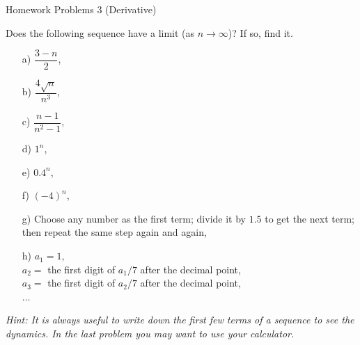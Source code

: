  \begin{center}\begin{large} Homework Problems 3 (Derivative) \end{large}\end{center}
 \bigskip




\begin{problem}
   Does the following sequence have a limit (as $n\to\infty$)? If so, find it.

    \begin{enumerate}
        \item[a) ] $\dfrac{3-n}{2}$,
        
        \item[b) ] $\dfrac{4\sqrt{n}}{n^3}$,
        
        \item[c) ] $\dfrac{n-1}{n^2-1}$,
        
        \item[d) ] $1^n$,

        \item[e) ] $0.4^n$,

        \item[f) ] $(-4)^n$,

        \item[g) ] Choose any number as the first term; divide it by $1.5$ to get the next term; then repeat the same step again and again,

        \item[h) ] $a_1=1$, \\$a_2=$ the first digit of $a_1/7$ after the decimal point,
        \\$a_3=$ the first digit of $a_2/7$ after the decimal point,
        \\$\dots$

    \end{enumerate}


{\small \textit{Hint:  It is always useful to write down the first few terms of a sequence to see the dynamics. In the last problem you may want to use your calculator.}
    }
\end{problem}



\medskip



